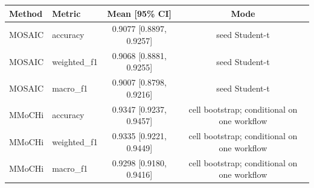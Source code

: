 \begin{tabular}{llcc}
\toprule
Method & Metric & Mean [95\% CI] & Mode \\
\midrule
MOSAIC & accuracy & 0.9077 [0.8897, 0.9257] & seed Student-t \\
MOSAIC & weighted\_f1 & 0.9068 [0.8881, 0.9255] & seed Student-t \\
MOSAIC & macro\_f1 & 0.9007 [0.8798, 0.9216] & seed Student-t \\
MMoCHi & accuracy & 0.9347 [0.9237, 0.9457] & cell bootstrap; conditional on one workflow \\
MMoCHi & weighted\_f1 & 0.9335 [0.9221, 0.9449] & cell bootstrap; conditional on one workflow \\
MMoCHi & macro\_f1 & 0.9298 [0.9180, 0.9416] & cell bootstrap; conditional on one workflow \\
\bottomrule
\end{tabular}
